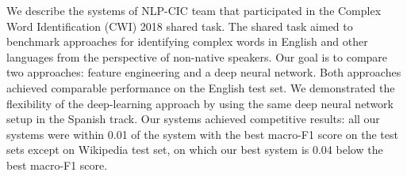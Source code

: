 We describe the systems of NLP-CIC team that participated in the Complex Word Identification (CWI) 2018 shared task. The shared task aimed to benchmark approaches for identifying complex words in English and other languages from the perspective of non-native speakers. Our goal is to compare two approaches: feature engineering and a deep neural network. Both approaches achieved comparable performance on the English test set. We demonstrated the flexibility of the deep-learning approach by using the same deep neural network setup in the Spanish track. Our systems achieved competitive results: all our systems were within 0.01 of the system with the best macro-F1 score on the test sets except on Wikipedia test set, on which our best system is 0.04 below the best macro-F1 score.
